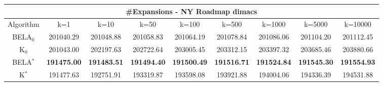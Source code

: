 \begin{tabular}{c|cccccccc}\toprule
\multicolumn{9}{c}{#Expansions - NY Roadmap dimacs}\\ \midrule
Algorithm & k=1 & k=10 & k=50 & k=100 & k=500 & k=1000 & k=5000 & k=10000 \\ \midrule
BELA$_0$ & 201040.29 & 201048.88 & 201058.83 & 201064.19 & 201078.84 & 201086.06 & 201104.20 & 201112.45 \\
K$_0$ & 201043.00 & 202197.63 & 202722.64 & 203005.45 & 203312.15 & 203397.32 & 203685.46 & 203880.66 \\
BELA$^*$ & \textbf{191475.00} & \textbf{191483.51} & \textbf{191494.40} & \textbf{191500.49} & \textbf{191516.71} & \textbf{191524.84} & \textbf{191545.30} & \textbf{191554.93} \\
K$^*$ & 191477.63 & 192751.91 & 193319.87 & 193598.08 & 193921.88 & 194004.06 & 194336.39 & 194531.88 \\ \bottomrule 
\end{tabular}
